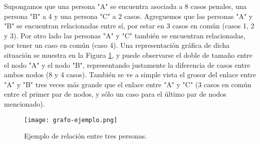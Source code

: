 Supongamos que una persona "A" se encuentra asociada a 8 casos penales, una persona "B" a 4 y una persona "C" a 2 casos. Agreguemos que las personas "A" y "B" se encuentran relacionadas entre sí, por estar en 3 casos en común (casos 1, 2 y 3). Por otro lado las personas "A" y "C" también se encuentran relacionadas, por tener un caso en común (caso 4).  Una representación gráfica de dicha situación se muestra en la Figura \ref{fig:grafode2}, y puede observarse el doble de tamaño entre el nodo "A" y el nodo "B", representando justamente la diferencia de casos entre ambos nodos (8 y 4 casos). También se ve a simple vista el grosor del enlace entre "A" y "B" tres veces más grande que el enlace entre "A" y "C" (3 casos en común entre el primer par de nodos, y sólo un caso para el último par de nodos mencionado). 
\begin{figure}
	\centering
	\texttt{[image: grafo-ejemplo.png]}
	\caption{Ejemplo de relación entre tres personas.} 
	\label{fig:grafode2}
\end{figure}
\vspace{-25pt}
